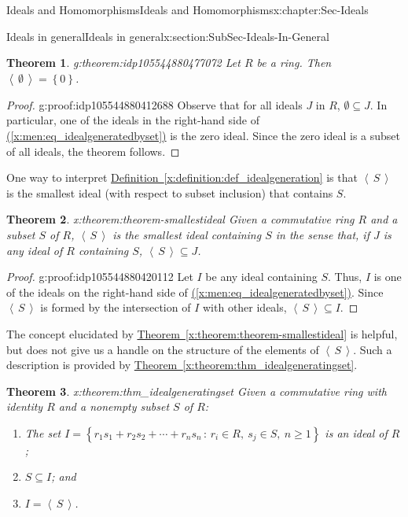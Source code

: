 \documentclass[oneside,10pt,]{book}
\newcommand{\xreffont}{\relax}
\numberwithin{equation}{section}
\renewcommand{\ge}{\geqslant}
\newcommand{\ideal}[1]{\left\langle\, #1 \,\right\rangle}
\newcommand{\set}[1]{\left\{ {#1} \right\}}
\newcommand{\setof}[2]{{\left\{#1\,\colon\,#2\right\}}}
\newtheorem{theorem}{Theorem}[section]
\begin{document}
\begin{chapterptx}{Ideals and Homomorphisms}{}{Ideals and Homomorphisms}{}{}{x:chapter:Sec-Ideals}
\begin{sectionptx}{Ideals in general}{}{Ideals in general}{}{}{x:section:SubSec-Ideals-In-General}
\begin{theorem}{}{}{g:theorem:idp105544880477072}%
Let \(R\) be a ring. Then \(\ideal{\emptyset} = \set{0}\).\end{theorem}
\begin{proof}{}{g:proof:idp105544880412688}
Observe that for all ideals \(J\) in \(R\), \(\emptyset\subseteq J\). In particular, one of the ideals in the right-hand side of \hyperref[x:men:eq_idealgeneratedbyset]{({\xreffont\ref{x:men:eq_idealgeneratedbyset}})} is the zero ideal. Since the zero ideal is a subset of all ideals, the theorem follows.%
\end{proof}
One way to interpret \hyperref[x:definition:def_idealgeneration]{Definition~{\xreffont\ref{x:definition:def_idealgeneration}}} is that \(\ideal{S}\) is the smallest ideal (with respect to subset inclusion) that contains \(S\).%
\begin{theorem}{}{}{x:theorem:theorem-smallestideal}%
Given a commutative ring \(R\) and a subset \(S\) of \(R\), \(\ideal{S}\) is the smallest ideal containing \(S\) in the sense that, if \(J\) is any ideal of \(R\) containing \(S\), \(\ideal{S}\subseteq J\).%
\end{theorem}
\begin{proof}{}{g:proof:idp105544880420112}
Let \(I\) be any ideal containing \(S\). Thus, \(I\) is one of the ideals on the right-hand side of \hyperref[x:men:eq_idealgeneratedbyset]{({\xreffont\ref{x:men:eq_idealgeneratedbyset}})}. Since \(\ideal{S}\) is formed by the intersection of \(I\) with other ideals, \(\ideal{S}\subseteq I\).%
\end{proof}
The concept elucidated by \hyperref[x:theorem:theorem-smallestideal]{Theorem~{\xreffont\ref{x:theorem:theorem-smallestideal}}} is helpful, but does not give us a handle on the structure of the elements of \(\ideal{S}\). Such a description is provided by \hyperref[x:theorem:thm_idealgeneratingset]{Theorem~{\xreffont\ref{x:theorem:thm_idealgeneratingset}}}.%
\begin{theorem}{}{}{x:theorem:thm_idealgeneratingset}%
Given a commutative ring with identity \(R\) and a nonempty subset \(S\) of \(R\):%
\begin{enumerate}
\item{}The set \(I = \setof{r_1 s_1 + r_2 s_2 + \cdots + r_n s_n}{r_i\in R, \ s_j \in S,\ n\ge 1}\) is an ideal of \(R\);%
\item{}\(S\subseteq I\); and%
\item{}\(I = \ideal{S}\).%
\end{enumerate}

\end{theorem}
\end{sectionptx}
\end{chapterptx}
\end{document}

